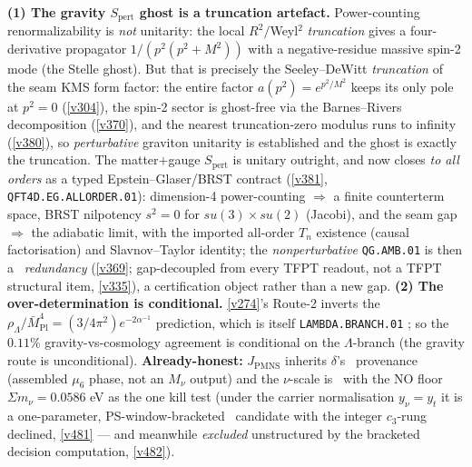 \documentclass[11pt,a4paper]{article}
\newcommand{\Mpl}{\bar M_{\mathrm{Pl}}}
\begin{document}
\begin{keybox}
\textbf{(1) The gravity $S_{\mathrm{pert}}$ ghost is a truncation artefact.} Power-counting renormalizability is
\emph{not} unitarity: the local $R^2/$Weyl$^2$ \emph{truncation} gives a four-derivative propagator
$1/(p^2(p^2+M^2))$ with a negative-residue massive spin-2 mode (the Stelle ghost). But that is precisely the
Seeley--DeWitt \emph{truncation} of the seam KMS form factor: the entire factor $a(p^2){=}e^{p^2/M^2}$ keeps its
only pole at $p^2{=}0$ (\vref{v304}), the spin-2 sector is ghost-free via the Barnes--Rivers decomposition
(\vref{v370}), and the nearest truncation-zero modulus runs to infinity (\vref{v380}), so \emph{perturbative}
graviton unitarity is established and the ghost is exactly the truncation. The matter$+$gauge $S_{\mathrm{pert}}$ is
unitary outright, and now closes \emph{to all orders} as a typed Epstein--Glaser/BRST contract
(\vref{v381}, \texttt{QFT4D.EG.ALLORDER.01}): dimension-4 power-counting $\Rightarrow$ a finite counterterm space,
BRST nilpotency $s^2{=}0$ for $su(3){\times}su(2)$ (Jacobi), and the seam gap $\Rightarrow$ the adiabatic limit,
with the imported all-order $T_n$ existence (causal factorisation) and Slavnov--Taylor identity; the
\emph{nonperturbative} \texttt{QG.AMB.01} is then a \mC\ \emph{redundancy} (\vref{v369};
gap-decoupled from every TFPT readout, not a TFPT structural item, \vref{v335}), a certification object rather than
a new gap.
\textbf{(2) The over-determination is conditional.} \vref{v274}'s Route-2 inverts the
$\rho_\Lambda/\Mpl^4=(3/4\pi^2)e^{-2\alpha^{-1}}$ prediction, which is itself \texttt{LAMBDA.BRANCH.01} \mC;
so the $0.11\%$ gravity-vs-cosmology agreement is conditional on the $\Lambda$-branch (the gravity route is
unconditional). \textbf{Already-honest:} $J_{\mathrm{PMNS}}$ inherits $\delta$'s \mC\ provenance (assembled
$\mu_6$ phase, not an $M_\nu$ output) and the $\nu$-scale is \mO\ with the NO floor $\Sigma m_\nu=0.0586$ eV as
the one kill test (under the carrier normalisation $y_\nu{=}y_t$ it is a one-parameter, PS-window-bracketed
\mO\ candidate with the integer $c_3$-rung declined, \vref{v481} --- and meanwhile \emph{excluded}
unstructured by the bracketed decision computation, \vref{v482}).
\end{keybox}
\end{document}
